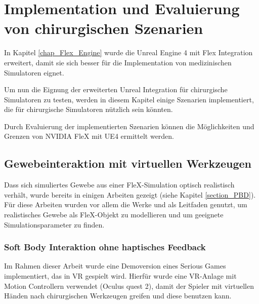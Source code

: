 \chapter{Implementation und Evaluierung von chirurgischen Szenarien}
\label{chap_Szenarien}

In Kapitel \ref{chap_Flex_Engine} wurde die Unreal Engine 4 mit Flex Integration erweitert, damit sie sich besser für die Implementation von medizinischen Simulatoren eignet. 

Um nun die Eignung der erweiterten Unreal Integration für chirurgische Simulatoren zu testen, werden in diesem Kapitel einige Szenarien implementiert, die für chirurgische Simulatoren nützlich sein könnten.

Durch Evaluierung der implementierten Szenarien können die Möglichkeiten und Grenzen von NVIDIA FleX mit \ac{UE4} ermittelt werden.


\section{Gewebeinteraktion mit virtuellen Werkzeugen}
\label{sec_FSystem}

Dass sich simuliertes Gewebe aus einer FleX-Simulation optisch realistisch verhält, wurde bereits in einigen Arbeiten gezeigt (siehe Kapitel \ref{section_PBD}). Für diese Arbeiten wurden vor allem die Werke \cite{PBDKidney} und \cite{BreastBiopsy} als Leitfaden genutzt, um realistisches Gewebe als FleX-Objekt zu modellieren und um geeignete Simulationsparameter zu finden.

\subsection{Soft Body Interaktion ohne haptisches Feedback}
\label{subsec_no_haptic}
Im Rahmen dieser Arbeit wurde eine Demoversion eines Serious Games implementiert, das in VR gespielt wird. Hierfür wurde eine VR-Anlage mit Motion Controllern verwendet (Oculus quest 2), damit der Spieler mit virtuellen Händen nach chirurgischen Werkzeugen greifen und diese benutzen kann.

